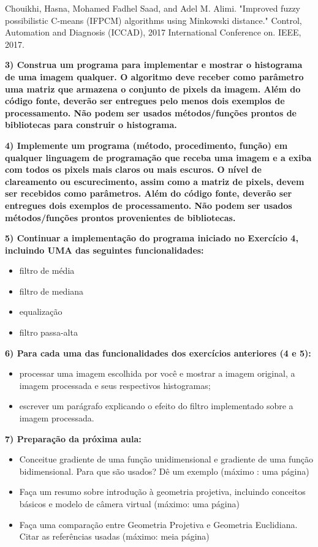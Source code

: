 \documentclass[a4paper]{sbgames}               %
\begin{document}
Chouikhi, Hasna, Mohamed Fadhel Saad, and Adel M. Alimi. "Improved fuzzy possibilistic C-means (IFPCM) algorithms using Minkowski distance." Control, Automation and Diagnosis (ICCAD), 2017 International Conference on. IEEE, 2017.







\textbf{3) Construa um programa para implementar e mostrar o histograma de uma imagem qualquer. O algoritmo deve receber como parâmetro uma matriz que armazena o conjunto de pixels da imagem. Além do código fonte, deverão ser entregues pelo menos dois exemplos de processamento. Não podem ser usados métodos/funções prontos de bibliotecas para construir o histograma.}

\textbf{4) Implemente um programa (método, procedimento, função) em qualquer
linguagem de programação que receba uma imagem e a exiba com todos
os pixels mais claros ou mais escuros. O nível de clareamento ou
escurecimento, assim como a matriz de pixels, devem ser recebidos
como parâmetros. Além do código fonte, deverão ser entregues dois
exemplos de processamento. Não podem ser usados métodos/funções
prontos provenientes de bibliotecas.}

\textbf{5) Continuar a implementação do programa iniciado no Exercício 4, incluindo UMA das seguintes funcionalidades:}

\begin{itemize}
\item filtro de média
\item filtro de mediana
\item equalização
\item filtro passa-alta
\end{itemize}

\textbf{6)  Para cada uma das funcionalidades dos exercícios anteriores (4 e 5):}
\begin{itemize}
\item processar uma imagem escolhida por você e mostrar a imagem original, a imagem processada e seus respectivos histogramas;
\item escrever um parágrafo explicando o efeito do filtro implementado sobre a
imagem processada.
\end{itemize}

\textbf{7) Preparação da próxima aula:}
\begin{itemize}
\item Conceitue gradiente de uma função unidimensional e gradiente de uma função bidimensional. Para que são usados? Dê um exemplo (máximo :
uma página)
\item Faça um resumo sobre introdução à geometria projetiva, incluindo
conceitos básicos e modelo de câmera virtual (máximo: uma página)
\item Faça uma comparação entre Geometria Projetiva e Geometria Euclidiana.
Citar as referências usadas (máximo: meia página)
\end{itemize}
\end{document}
